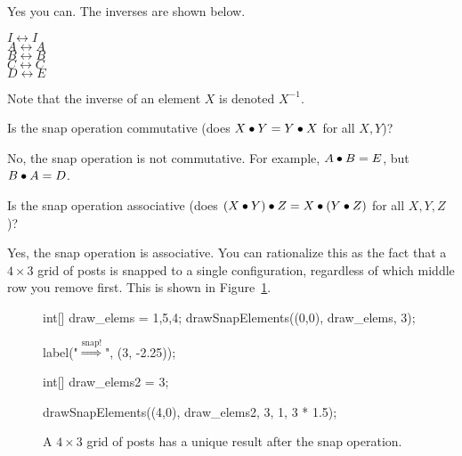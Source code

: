 \documentclass[../key.tex]{subfiles}
\begin{document}
\noindent Yes you can. The inverses are shown below.
\begin{multicols}{5}
\centering
$I\leftrightarrow I$\\
$A\leftrightarrow A$\\
$B\leftrightarrow B$\\
$C\leftrightarrow C$\\
$D\leftrightarrow E$
\end{multicols}

\noindent Note that the inverse of an element $X$ is denoted $X^{-1}$.

\begin{outer_problem}
\item

\begin{inner_problem}[start=1,leftmargin=25pt]
\item Is the snap operation commutative (does $X \bullet Y = Y \bullet X$ for all $X,Y$)?
\end{inner_problem}
\end{outer_problem}

\noindent No, the snap operation is not commutative. For example, $A\bullet B=E$, but $B\bullet A = D$.

\begin{inner_problem}
\item Is the snap operation associative (does $(X \bullet Y) \bullet Z = X \bullet (Y\bullet Z)$ for all $X,Y,Z$)?
\end{inner_problem}

\noindent Yes, the snap operation is associative. You can rationalize this as the fact that a $4\times 3$ grid of posts is snapped to a single configuration, regardless of which middle row you remove first. This is shown in Figure~\ref{fig:four_by_three}.

\begin{figure}[h]
	\begin{center}
		\begin{minipage}[b]{\textwidth}
			\centering
			\begin{asy}[width=0.2\textwidth]
				int[] draw_elems = {1,5,4};
				drawSnapElements((0,0), draw_elems, 3);

				label("$\stackrel{\text{snap!}}{\Longrightarrow}$", (3, -2.25));

				int[] draw_elems2 = {3};

				drawSnapElements((4,0), draw_elems2, 3, 1, 3 * 1.5);
			\end{asy}
		\end{minipage}
	\end{center}
	\vspace*{-2\baselineskip}
	\begin{center}
		\begin{minipage}[t]{\textwidth}
			\caption{A $4\times 3$ grid of posts has a unique result after the snap operation.}
			\label{fig:four_by_three}
		\end{minipage}
	\end{center}
	\vspace*{-2\baselineskip}
\end{figure}
\end{document}
